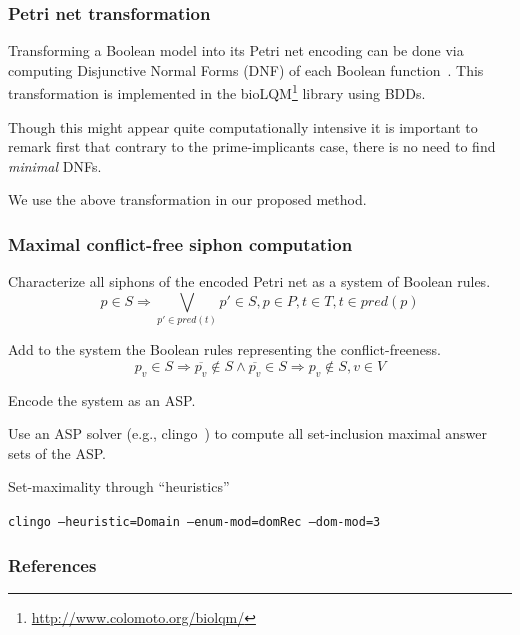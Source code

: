 \documentclass{beamer}              %
\begin{document}
\begin{frame}
\frametitle{Petri net transformation}

Transforming a Boolean model into its Petri net encoding can be done via computing Disjunctive Normal Forms (DNF) of each Boolean function~\cite{chatain2014characterization}. This transformation is implemented in the bioLQM\footnote{\url{http://www.colomoto.org/biolqm/}} library using BDDs.

\hspace{0.8cm}

Though this might appear quite computationally intensive it is important to remark first that contrary to the prime-implicants case, there is no need to find \emph{minimal} DNFs.

\hspace{0.8cm}

We use the above transformation in our proposed method.

\end{frame}

\begin{frame}
\frametitle{Maximal conflict-free siphon computation}

Characterize all siphons of the encoded Petri net as a system of Boolean rules.
\begin{equation*}
\label{eq:siphon}
p \in S \Rightarrow \bigvee_{p' \in pred(t)}p' \in S, p \in P, t \in T, t \in pred(p)
\end{equation*}

Add to the system the Boolean rules representing the conflict-freeness.
\begin{equation*}
\label{eq:conflict}
p_v \in S \Rightarrow \overline{p_v} \not \in S \wedge \overline{p_v} \in S \Rightarrow p_v \not \in S, v \in V
\end{equation*}

Encode the system as an ASP.

\hspace{0.8cm}

Use an ASP solver (e.g., clingo~\cite{DBLP:journals/aicom/GebserKKOSS11}) to compute all set-inclusion maximal answer sets of the ASP.

\hspace{0.8cm}

Set-maximality through “heuristics”

\texttt{clingo --heuristic=Domain --enum-mod=domRec --dom-mod=3}

\end{frame}

\begin{frame}[allowframebreaks]
  \frametitle{References}
	
	
\end{frame}
\end{document}
